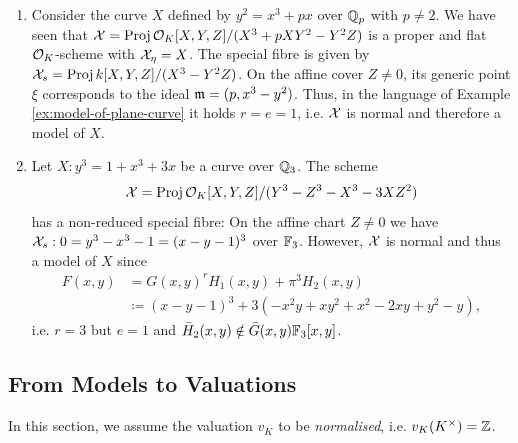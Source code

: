 \begin{example}\label{ex:particular-model-of-plane-curve}
    \begin{enumerate}
        \item Consider the curve $X$ defined by $y^2 = x^3 + px$ over $\mathbb Q_p$ with $p \neq 2$.
            We have seen that $\mathcal X = \operatorname{Proj}{\mathcal O_K[X,Y,Z]/(X^3 + pXY^2 - Y^2Z)}$ is a proper and flat $\mathcal O_K$-scheme with $\mathcal X_\eta = X$.
            The special fibre is given by $\mathcal X_s = \operatorname{Proj}{k[X,Y,Z]/(X^3 - Y^2Z)}$.
            On the affine cover $Z\neq 0$, its generic point $\xi$ corresponds to the ideal $\mathfrak m = (p, x^3-y^2)$.
            Thus, in the language of Example \ref{ex:model-of-plane-curve} it holds $r=e=1$, i.e. $\mathcal X$ is normal and therefore a model of $X$.
        \item Let $X: y^3 = 1 + x^3 + 3x$ be a curve over $\mathbb Q_3$.
            The scheme 
            \begin{align}
                \mathcal X = \operatorname{Proj}{\mathcal O_K[X,Y,Z]/(Y^3 - Z^3 - X^3 - 3XZ^2)}
            \end{align}
            has a non-reduced special fibre:
            On the affine chart $Z \neq 0$ we have $\mathcal X_s: 0 = y^3 - x^3 - 1 = (x - y - 1)^3$ over $\mathbb F_3$.
            However, $\mathcal X$ is normal and thus a model of $X$ since
            \begin{align*}
                F(x,y) &= G(x,y)^r H_1(x,y) + \pi^3 H_2(x,y) \\
                    &\coloneqq (x-y-1)^3 + 3(-x^2y + xy^2 + x^2 - 2xy + y^2 - y),
            \end{align*}
            i.e. $r=3$ but $e=1$ and $\bar{H}_2(x,y) \notin \bar{G}(x,y)\mathbb F_3[x,y]$.
    \end{enumerate}
\end{example}


\subsection{From Models to Valuations} \label{subsec:from-valuations-to-models}
In this section, we assume the valuation $v_K$ to be \textit{normalised}, i.e. $v_K(K^\times) = \mathbb Z$.

